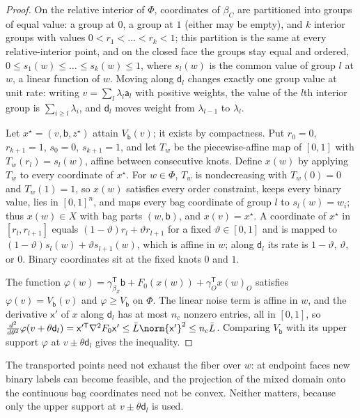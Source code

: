 \begin{proof}
On the relative interior of $\Phi$, coordinates of $\beta_C$ are partitioned
into groups of equal value: a group at $0$, a group at $1$ (either may be
empty), and $k$ interior groups with values $0<r_1<\dots<r_k<1$; this
partition is the same at every relative-interior point, and on the closed
face the groups stay equal and ordered, $0\le s_1(w)\le\dots\le s_k(w)\le1$,
where $s_l(w)$ is the common value of group $l$ at $w$, a linear function of
$w$. Moving along $\mathsf d_l$ changes exactly one group value at unit rate:
writing $v=\sum_l\lambda_l\mathsf a_l$ with positive weights, the value of
the $l$th interior group is $\sum_{i\ge l}\lambda_i$, and $\mathsf d_l$ moves
weight from $\lambda_{l-1}$ to $\lambda_l$.

Let $x^\star=(v,\mathsf b,z^\star)$ attain $V_{\mathsf b}(v)$; it exists by
compactness. Put $r_0=0$, $r_{k+1}=1$, $s_0=0$, $s_{k+1}=1$, and let $T_w$ be
the piecewise-affine map of $[0,1]$ with $T_w(r_l)=s_l(w)$, affine between
consecutive knots. Define $x(w)$ by applying $T_w$ to every coordinate of
$x^\star$. For $w\in\Phi$, $T_w$ is nondecreasing with $T_w(0)=0$ and
$T_w(1)=1$, so $x(w)$ satisfies every order constraint, keeps every binary
value, lies in $[0,1]^n$, and maps every bag coordinate of group $l$ to
$s_l(w)=w_i$; thus $x(w)\in X$ with bag parts $(w,\mathsf b)$, and $x(v)=x^\star$.
A coordinate of $x^\star$ in $[r_l,r_{l+1}]$ equals
$(1-\vartheta)r_l+\vartheta r_{l+1}$ for a fixed $\vartheta\in[0,1]$ and is
mapped to $(1-\vartheta)s_l(w)+\vartheta s_{l+1}(w)$, which is affine in $w$;
along $\mathsf d_l$ its rate is $1-\vartheta$, $\vartheta$, or $0$. Binary
coordinates sit at the fixed knots $0$ and $1$.

The function $\varphi(w)=\gamma_{\beta_Z}^{\mathsf T}\mathsf b+F_0(x(w))+
\gamma_O^{\mathsf T}x(w)_O$ satisfies $\varphi(v)=V_{\mathsf b}(v)$ and
$\varphi\ge V_{\mathsf b}$ on $\Phi$. The linear noise term is affine in $w$,
and the derivative $\mathsf x'$ of $x$ along $\mathsf d_l$ has at most $n_c$
nonzero entries, all in $[0,1]$, so
$\frac{d^2}{d\theta^2}\varphi(v+\theta\mathsf d_l)=\mathsf x'^{\mathsf
T}\nabla^2F_0\mathsf x'\le\bar L\norm{\mathsf x'}^2\le n_c\bar L$. Comparing
$V_{\mathsf b}$ with its upper support $\varphi$ at $v\pm\theta\mathsf d_l$
gives the inequality.
\end{proof}

The transported points need not exhaust the fiber over $w$: at endpoint faces
new binary labels can become feasible, and the projection of the mixed domain
onto the continuous bag coordinates need not be convex. Neither matters,
because only the upper support at $v\pm\theta\mathsf d_l$ is used.

